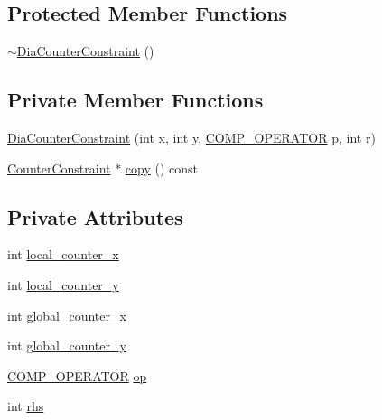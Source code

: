 \subsection*{Protected Member Functions}
\begin{DoxyCompactItemize}
\item 
\mbox{\hyperlink{classgraphsat_1_1_dia_counter_constraint_a4a1e57fd6bf743dcd7430b03b85ebebb}{$\sim$\+Dia\+Counter\+Constraint}} ()
\end{DoxyCompactItemize}
\subsection*{Private Member Functions}
\begin{DoxyCompactItemize}
\item 
\mbox{\hyperlink{classgraphsat_1_1_dia_counter_constraint_a16aa92c2e28e0a3e5e110f413a9a3035}{Dia\+Counter\+Constraint}} (int x, int y, \mbox{\hyperlink{namespacegraphsat_acfb5939f9bdafbd9aea0d084b9a56f69}{C\+O\+M\+P\+\_\+\+O\+P\+E\+R\+A\+T\+OR}} p, int r)
\item 
\mbox{\hyperlink{classgraphsat_1_1_counter_constraint}{Counter\+Constraint}} $\ast$ \mbox{\hyperlink{classgraphsat_1_1_dia_counter_constraint_a8298e206d438c302fa43a568bec517ae}{copy}} () const
\end{DoxyCompactItemize}
\subsection*{Private Attributes}
\begin{DoxyCompactItemize}
\item 
int \mbox{\hyperlink{classgraphsat_1_1_dia_counter_constraint_a44b4289bb1156eb3e4faa6e91d02b7b6}{local\+\_\+counter\+\_\+x}}
\item 
int \mbox{\hyperlink{classgraphsat_1_1_dia_counter_constraint_ae8a47b3607236b908ac6ed5f95947e5d}{local\+\_\+counter\+\_\+y}}
\item 
int \mbox{\hyperlink{classgraphsat_1_1_dia_counter_constraint_a07d0929fb60ab39d8bf0f92a3612fb46}{global\+\_\+counter\+\_\+x}}
\item 
int \mbox{\hyperlink{classgraphsat_1_1_dia_counter_constraint_afd1424325f6984cd7cf4d3cc7dd1a2e3}{global\+\_\+counter\+\_\+y}}
\item 
\mbox{\hyperlink{namespacegraphsat_acfb5939f9bdafbd9aea0d084b9a56f69}{C\+O\+M\+P\+\_\+\+O\+P\+E\+R\+A\+T\+OR}} \mbox{\hyperlink{classgraphsat_1_1_dia_counter_constraint_a704e5bd6fca262934d1a5275bd05fda4}{op}}
\item 
int \mbox{\hyperlink{classgraphsat_1_1_dia_counter_constraint_addb34c4efce7f22541da59e48f6ada0e}{rhs}}
\end{DoxyCompactItemize}

